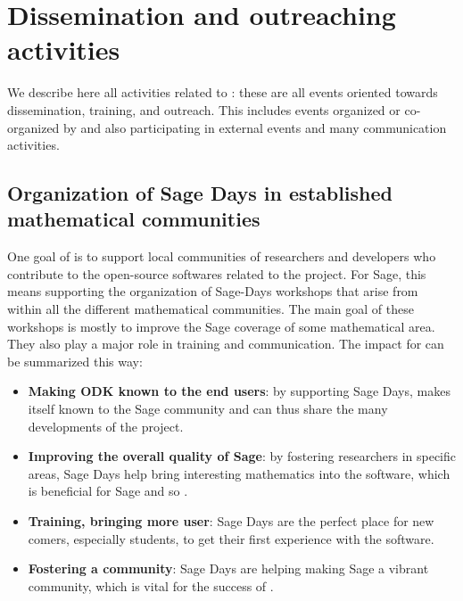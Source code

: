 \documentclass{deliverablereport}
\begin{document}

\newpage














\clearpage

\section{Dissemination and outreaching activities}

We describe here all activities related to :
these are all events oriented towards dissemination, training, and outreach. This
includes events organized or co-organized by \ODK and also
participating in external events and many communication activities.

\subsection{Organization of Sage Days in established mathematical communities}

One goal of \ODK is to support local communities of researchers
and developers who contribute to the open-source softwares related to
the project. For Sage, this means supporting the organization of Sage-Days
workshops that arise from within all the different mathematical communities. The main 
goal of these workshops is mostly to improve the Sage coverage of some mathematical
area. They also play a major role in training and communication. The
impact for \ODK can be summarized this way:

\begin{itemize}
\item \textbf{Making ODK known to the end users}: by supporting Sage Days,
\ODK makes itself known to the Sage community and can
thus share the many developments of the project.

\item \textbf{Improving the overall quality of Sage}: by fostering researchers
in specific areas, Sage Days help bring interesting mathematics into
the software, which is beneficial for Sage and so \ODK.

\item \textbf{Training, bringing more user}: Sage Days are the perfect place
for new comers, especially students, to get their first experience with the software.

\item \textbf{Fostering a community}: Sage Days are helping making Sage a vibrant
community, which is vital for the success of \ODK.
\end{itemize}
\end{document}
